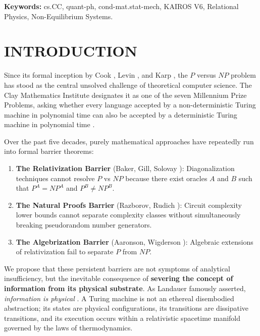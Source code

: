 \documentclass[10pt,twocolumn]{article}
\begin{document}
\vspace{1em}
\noindent\textbf{Keywords:} cs.CC, quant-ph, cond-mat.stat-mech, KAIROS V6, Relational Physics, Non-Equilibrium Systems.

\vspace{1em}






\section{INTRODUCTION}

Since its formal inception by Cook \cite{Cook1971}, Levin \cite{Levin1973}, and Karp \cite{Karp1972}, the $P$ versus $NP$ problem has stood as the central unsolved challenge of theoretical computer science. The Clay Mathematics Institute designates it as one of the seven Millennium Prize Problems, asking whether every language accepted by a non-deterministic Turing machine in polynomial time can also be accepted by a deterministic Turing machine in polynomial time \cite{Clay2000}.

Over the past five decades, purely mathematical approaches have repeatedly run into formal barrier theorems:
\begin{enumerate}
  \item \textbf{The Relativization Barrier} (Baker, Gill, Solovay \cite{BGS1975}): Diagonalization techniques cannot resolve $P$ vs $NP$ because there exist oracles $A$ and $B$ such that $P^A = NP^A$ and $P^B \neq NP^B$.
  \item \textbf{The Natural Proofs Barrier} (Razborov, Rudich \cite{Razborov1997}): Circuit complexity lower bounds cannot separate complexity classes without simultaneously breaking pseudorandom number generators.
  \item \textbf{The Algebrization Barrier} (Aaronson, Wigderson \cite{Aaronson2009}): Algebraic extensions of relativization fail to separate $P$ from $NP$.
\end{enumerate}

We propose that these persistent barriers are not symptoms of analytical insufficiency, but the inevitable consequence of \textbf{severing the concept of information from its physical substrate}. As Landauer famously asserted, \textit{information is physical} \cite{Landauer1961, Landauer1991}. A Turing machine is not an ethereal disembodied abstraction; its states are physical configurations, its transitions are dissipative transitions, and its execution occurs within a relativistic spacetime manifold governed by the laws of thermodynamics.
\end{document}
